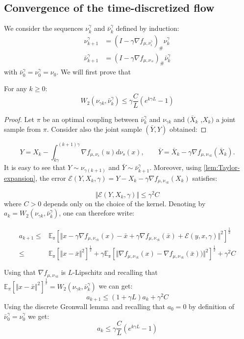 \subsection{Convergence of the time-discretized flow}\label{appendix:subsec:convegence_time_discrete}

We consider the sequences $\nu_{k}^{\gamma}$ and $\bar{\nu}_{k}^{\gamma}$
defined by induction: 
\begin{align*}
\nu_{k+1}^{\gamma} & =(I-\gamma\nabla f_{\mu,\nu_{^{k}}^{\gamma}})_{\#}\nu_{k}^{\gamma}\\
\bar{\nu}_{k+1}^{\gamma} & =(I-\gamma\nabla f_{\mu,\nu_{^{\gamma k}}})_{\#}\bar{\nu}_{k}^{\gamma}
\end{align*}
 with $\bar{\nu}_{0}^{\gamma}=\nu_{0}^{\gamma}=\nu_{0}$. We will
first prove that 
\begin{lemma}
\label{lem:euler_error_1}For any $k\geq0$:
\[
W_{2}(\nu_{\gamma k},\bar{\nu}_{k}^{\gamma})\le\gamma\frac{C}{L}(e^{k\gamma L}-1)
\]
\end{lemma}
\begin{proof}
Let $\pi$ be an optimal coupling between $\bar{\nu}_{k}^{\gamma}$
and $\nu_{\gamma k}$ and $(\bar{X}_{k}$ ,$X_{k})$ a joint sample
from $\pi$. Consider also the joint sample $(\bar{Y},Y)$ obtained:
\end{proof}
\[
Y=X_{k}-\int_{k\gamma}^{(k+1)\gamma}\nabla f_{\mu,\nu_{s}}(u)d\nu_{s}(x),\qquad\bar{Y}=\bar{X}_{k}-\gamma\nabla f_{\mu,\nu_{\gamma k}}(\bar{X}_{k}).
\]
It is easy to see that $Y\sim\nu_{\gamma(k+1)}$ and $\bar{Y}\sim\bar{\nu}_{k+1}^{\gamma}$.
Moreover, using \ref{lem:Taylor-expansion}, the error $\mathcal{E}(Y,X_{k},\gamma)=Y-X_{k}-\gamma\nabla f_{\mu,\nu_{\gamma k}}(X_{k})$
satisfies:

\[
\Vert\mathcal{E}(Y,X_{k},\gamma)\Vert\leq\gamma^{2}C
\]
where $C>0$ depends only on the choice of the kernel. Denoting by
$a_{k}=W_{2}(\nu_{\gamma k},\bar{\nu}_{k}^{\gamma})$, one can therefore
write:

\begin{align*}
a_{k+1}\leq & \mathbb{E_{\pi}}\left[\Vert x-\gamma\nabla f_{\mu,\nu_{\gamma k}}(x)-\bar{x}+\gamma\nabla f_{\mu,\nu_{\gamma k}}(\bar{x})+\mathcal{E}(y,x,\gamma)\Vert^{2}\right]^{\frac{1}{2}}\\
\leq & \mathbb{E_{\pi}}\left[\Vert x-\bar{x}\Vert^{2}\right]^{\frac{1}{2}}+\gamma\mathbb{E_{\pi}}\left[\Vert\nabla f_{\mu,\nu_{\gamma k}}(x)-\nabla f_{\mu,\nu_{\gamma k}}(\bar{x}))\Vert^{2}\right]^{\frac{1}{2}}+\gamma^{2}C\\
\\
\end{align*}
Using that $\nabla f_{\mu,\nu_{\gamma k}}$ is $L$-Lipschitz and
recalling that $\mathbb{E}_{\pi}\left[\Vert x-\bar{x}\Vert^{2}\right]^{\frac{1}{2}}=W_{2}(\nu_{\gamma k},\bar{\nu}_{k}^{\gamma})$
we can get:
\[
a_{k+1}\leq(1+\gamma L)a_{k}+\gamma^{2}C
\]
Using the discrete Gronwall lemma and recalling that $a_{0}=0$ by
definition of $\bar{\nu}_{0}^{\gamma}=\nu_{0}^{\gamma}$ we get:
\[
a_{k}\leq\gamma\frac{C}{L}(e^{k\gamma L}-1)
\]


